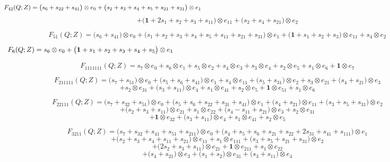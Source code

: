 \documentclass[12pt]{amsart}
\theoremstyle{plain}
\theoremstyle{definition}
\theoremstyle{remark}
\begin{document}
$$F_{ 42 }(Q;Z)=
\big( s_{6} + s_{22} + s_{41} \big) \otimes e_{ 0 }
+\big( s_{2} + s_{3} + s_{4} + s_{5} + s_{21} + s_{31} \big) \otimes e_{ 1 }  \hskip 5in \  $$ $$
+\big( \boldsymbol{1} + 2 s_{1} + s_{2} + s_{3} + s_{11} \big) \otimes e_{ 11 }
+\big( s_{2} + s_{4} + s_{21} \big) \otimes e_{ 2 }
$$

$$F_{ 51 }(Q;Z)=
\big( s_{6} + s_{41} \big) \otimes e_{ 0 }
+\big( s_{1} + s_{2} + s_{3} + s_{4} + s_{5} + s_{11} + s_{21} + s_{31} \big) \otimes e_{ 1 }
+\big( \boldsymbol{1} + s_{1} + s_{2} + s_{3} \big) \otimes e_{ 11 }
+ s_{4} \otimes e_{ 2 }
$$

$$F_{ 6 }(Q;Z)=
s_{6} \otimes e_{ 0 }
+\big( \boldsymbol{1} + s_{1} + s_{2} + s_{3} + s_{4} + s_{5} \big) \otimes e_{ 1 }
 \hskip 5in \  $$

$$F_{ 1111111 }(Q;Z)=
s_{7} \otimes e_{ 0 }
+ s_{6} \otimes e_{ 1 }
+ s_{5} \otimes e_{ 2 }
+ s_{4} \otimes e_{ 3 }
+ s_{3} \otimes e_{ 4 }
+ s_{2} \otimes e_{ 5 }
+ s_{1} \otimes e_{ 6 }
+ \boldsymbol{1} \otimes e_{ 7 }
$$

$$F_{ 211111 }(Q;Z)=
\big( s_{7} + s_{51} \big) \otimes e_{ 0 }
+\big( s_{5} + s_{6} + s_{41} \big) \otimes e_{ 1 }
+ s_{4} \otimes e_{ 11 }
+\big( s_{5} + s_{31} \big) \otimes e_{ 2 }
+ s_{3} \otimes e_{ 21 }
+\big( s_{4} + s_{21} \big) \otimes e_{ 3 } $$ $$
+ s_{2} \otimes e_{ 31 }
+\big( s_{3} + s_{11} \big) \otimes e_{ 4 }
+ s_{1} \otimes e_{ 41 }
+ s_{2} \otimes e_{ 5 }
+ \boldsymbol{1} \otimes e_{ 51 }
+ s_{1} \otimes e_{ 6 }
$$



$$F_{ 22111 }(Q;Z)=
\big( s_{7} + s_{32} + s_{51} \big) \otimes e_{ 0 }
+\big( s_{5} + s_{6} + s_{22} + s_{31} + s_{41} \big) \otimes e_{ 1 }
+\big( s_{4} + s_{21} \big) \otimes e_{ 11 }
+\big( s_{3} + s_{5} + s_{31} \big) \otimes e_{ 2 } $$ $$
+\big( s_{2} + s_{3} + s_{11} \big) \otimes e_{ 21 }
+ s_{1} \otimes e_{ 22 } 
+\big( s_{4} - s_{11} + s_{21} \big) \otimes e_{ 3 }
+ s_{2} \otimes e_{ 31 } $$ $$
+ \boldsymbol{1} \otimes e_{ 32 }
+\big( s_{3} + s_{11} \big) \otimes e_{ 4 }
+ s_{1} \otimes e_{ 41 }
+ s_{2} \otimes e_{ 5 }
$$

\vfill\eject
$$F_{ 3211 }(Q;Z)=
\big( s_{7} + s_{32} + s_{41} + s_{51} + s_{211} \big) \otimes e_{ 0 }
+\big( s_{4} + s_{5} + s_{6} + s_{21} + s_{22} + 2 s_{31} + s_{41} + s_{111} \big) \otimes e_{ 1 } $$ $$
+\big( s_{2} + s_{3} + s_{4} + s_{11} + s_{21} \big) \otimes e_{ 11 }
+ s_{1} \otimes e_{ 111 }
+\big( s_{3} + s_{5} + s_{21} + s_{31} \big) \otimes e_{ 2 } $$ $$
+\big( 2 s_{2} + s_{3} + s_{11} \big) \otimes e_{ 21 }
+ \boldsymbol{1} \otimes e_{ 211 }
+ s_{1} \otimes e_{ 22 } $$ $$
+\big( s_{4} + s_{21} \big) \otimes e_{ 3 }
+\big( s_{1} + s_{2} \big) \otimes e_{ 31 }
+\big( s_{3} + s_{11} \big) \otimes e_{ 4 }
$$
\end{document}

